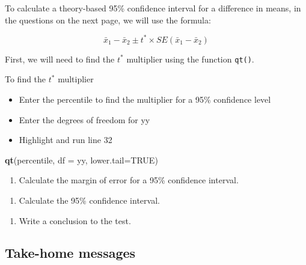 \documentclass[
]{report}
\newenvironment{Shaded}{\begin{snugshade}}{\end{snugshade}}
\newcommand{\AttributeTok}[1]{\textcolor[rgb]{0.13,0.29,0.53}{#1}}
\newcommand{\ConstantTok}[1]{\textcolor[rgb]{0.56,0.35,0.01}{#1}}
\newcommand{\FunctionTok}[1]{\textcolor[rgb]{0.13,0.29,0.53}{\textbf{#1}}}
\newcommand{\NormalTok}[1]{#1}
\providecommand{\tightlist}{%
  \setlength{\itemsep}{0pt}\setlength{\parskip}{0pt}}
\begin{document}
To calculate a theory-based 95\% confidence interval for a difference in means, in the questions on the next page, we will use the formula:

\[\bar{x}_1- \bar{x}_2\pm t^* \times SE(\bar{x}_1- \bar{x}_2)\]

First, we will need to find the \(t^*\) multiplier using the function \texttt{qt()}.

To find the \(t^*\) multiplier

\begin{itemize}
\item
  Enter the percentile to find the multiplier for a 95\% confidence level
\item
  Enter the degrees of freedom for yy
\item
  Highlight and run line 32
\end{itemize}

\begin{Shaded}
\begin{Highlighting}[]
\FunctionTok{qt}\NormalTok{(percentile, }\AttributeTok{df =}\NormalTok{ yy, }\AttributeTok{lower.tail=}\ConstantTok{TRUE}\NormalTok{)}
\end{Highlighting}
\end{Shaded}

\begin{enumerate}
\def\labelenumi{\arabic{enumi}.}
\setcounter{enumi}{8}
\tightlist
\item
  Calculate the margin of error for a 95\% confidence interval.
\end{enumerate}

\vspace{0.5in}

\begin{enumerate}
\def\labelenumi{\arabic{enumi}.}
\setcounter{enumi}{9}
\tightlist
\item
  Calculate the 95\% confidence interval.
\end{enumerate}

\vspace{0.6in}

\begin{enumerate}
\def\labelenumi{\arabic{enumi}.}
\setcounter{enumi}{10}
\tightlist
\item
  Write a conclusion to the test.
  \vspace{0.7in}
\end{enumerate}

\subsection{Take-home messages}\label{take-home-messages-23}
\end{document}
